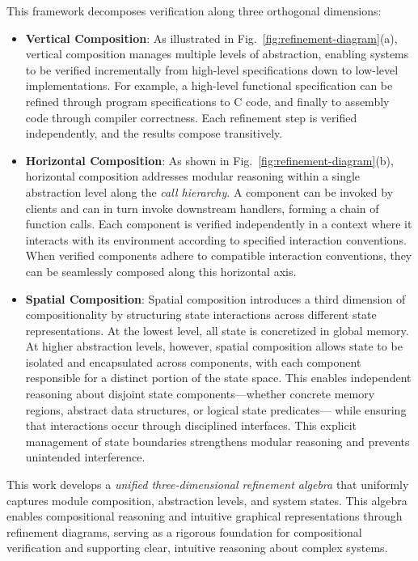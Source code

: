 This framework decomposes verification
along three orthogonal dimensions:

\begin{itemize}
  \item \textbf{Vertical Composition}:
    As illustrated in Fig.~\ref{fig:refinement-diagram}(a),
    vertical composition manages multiple levels of abstraction,
    enabling systems to be verified incrementally
    from high-level specifications down to low-level implementations.
    For example, a high-level functional specification
    can be refined through program specifications to C code,
    and finally to assembly code through compiler correctness.
    Each refinement step is verified independently,
    and the results compose transitively.
  \item \textbf{Horizontal Composition}:
    As shown in Fig.~\ref{fig:refinement-diagram}(b),
    horizontal composition addresses modular reasoning
    within a single abstraction level
    along the \emph{call hierarchy}.
    A component can be invoked by clients
    and can in turn invoke downstream handlers,
    forming a chain of function calls.
    Each component is verified independently
    in a context where it interacts with its environment
    according to specified interaction conventions.
    When verified components adhere to compatible interaction conventions,
    they can be seamlessly composed along this horizontal axis.
  \item \textbf{Spatial Composition}:
    Spatial composition introduces
    a third dimension of compositionality
    by structuring state interactions across different state representations.
    At the lowest level,
    all state is concretized in global memory.
    At higher abstraction levels,
    however, spatial composition allows
    state to be isolated and encapsulated across components,
    with each component responsible for a distinct portion of the state space.
    This enables independent reasoning about disjoint state components—whether
    concrete memory regions, abstract data structures, or logical state predicates—%
    while ensuring that interactions
    occur through disciplined interfaces.
    This explicit management of state boundaries
    strengthens modular reasoning
    and prevents unintended interference.
\end{itemize}

This work develops a
\emph{unified three-dimensional refinement algebra}
that uniformly captures
module composition,
abstraction levels,
and system states.
This algebra enables compositional reasoning
and intuitive graphical representations
through refinement diagrams,
serving as a rigorous foundation
for compositional verification
and supporting clear, intuitive reasoning about complex systems.

